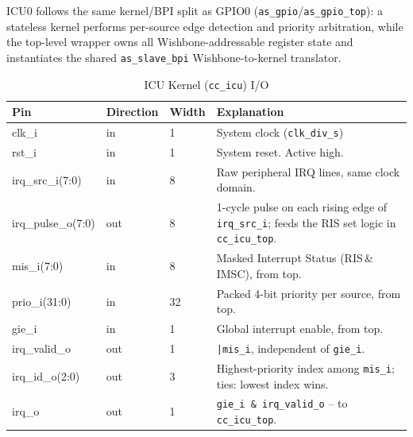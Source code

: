 ICU0 follows the same kernel/BPI split as GPIO0
(\texttt{as\_gpio}/\texttt{as\_gpio\_top}): a stateless kernel performs
per-source edge detection and priority arbitration, while the top-level
wrapper owns all Wishbone-addressable register state and instantiates the
shared \texttt{as\_slave\_bpi} Wishbone-to-kernel translator.

\begin{table}[H]
\caption{ICU Kernel (\texttt{cc\_icu}) I/O}
\label{tab:asIcuPer04a}
\centering
\begin{tabularx}{\textwidth}{|l |l |l |X|}
  \hline
  Pin & Direction & Width & Explanation \\
  \hline
  \hline
  clk\_i & in & 1 & System clock (\texttt{clk\_div\_s}) \\
  \hline
  rst\_i & in & 1 & System reset. Active high. \\
  \hline
  irq\_src\_i(7:0) & in & 8 & Raw peripheral IRQ lines, same clock domain. \\
  \hline
  irq\_pulse\_o(7:0) & out & 8 & 1-cycle pulse on each rising edge of
    \texttt{irq\_src\_i}; feeds the RIS set logic in \texttt{cc\_icu\_top}. \\
  \hline
  mis\_i(7:0) & in & 8 & Masked Interrupt Status (RIS\,\&\,IMSC), from top. \\
  \hline
  prio\_i(31:0) & in & 32 & Packed 4-bit priority per source, from top. \\
  \hline
  gie\_i & in & 1 & Global interrupt enable, from top. \\
  \hline
  irq\_valid\_o & out & 1 & \texttt{|mis\_i}, independent of \texttt{gie\_i}. \\
  \hline
  irq\_id\_o(2:0) & out & 3 & Highest-priority index among \texttt{mis\_i};
    ties: lowest index wins. \\
  \hline
  irq\_o & out & 1 & \texttt{gie\_i \& irq\_valid\_o} -- to \texttt{cc\_icu\_top}. \\
  \hline
\end{tabularx}
\end{table}

